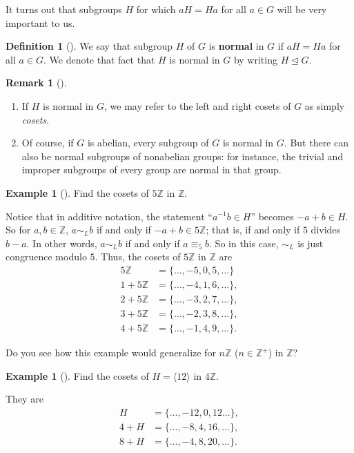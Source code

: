 \documentclass[10pt,]{book}
\newcommand{\terminology}[1]{\textbf{#1}}
\theoremstyle{plain}
\theoremstyle{definition}
\newtheorem{definition}[theorem]{Definition}
\theoremstyle{definition}
\newtheorem{remark}[theorem]{Remark}
\theoremstyle{definition}
\newtheorem{example}[theorem]{Example}
\theoremstyle{definition}
\numberwithin{equation}{section}
\def\Z{\mathbb{Z}}
\def\siml{\sim_L}
\newcommand{\amp}{&}
\begin{document}
It turns out that subgroups \(H\) for which \(aH=Ha\) for all \(a\in
G\) will be very important to us.%
\begin{definition}[{}]\label{definition-60}
We say that subgroup \(H\) of \(G\) is \terminology{normal} in \(G\) if \(aH=Ha\) for all \(a\in G\). We denote that fact that \(H\) is normal in \(G\) by writing \(H\unlhd G\).%
\end{definition}
\begin{remark}[]\label{remark-37}
\leavevmode%
\begin{enumerate}
\item\hypertarget{li-406}{}If \(H\) is normal in \(G\), we may refer to the left and right cosets of \(G\) as simply \emph{cosets}.%
\item\hypertarget{li-407}{}Of course, if \(G\) is abelian, every subgroup of \(G\) is normal in \(G\). But there can also be normal subgroups of nonabelian groups: for instance, the trivial and improper subgroups of every group are normal in that group.%
\end{enumerate}
\end{remark}
\begin{example}[]\label{example-71}
Find the cosets of \(5\Z\) in \(\Z\).%
\par
Notice that in additive notation, the statement ``\(a^{-1}b\in H\)'' becomes \(-a+b\in H\). So for \(a,b\in \Z\), \(a\siml b\) if and only if \(-a+b \in
5\Z\); that is, if and only if \(5\) divides \(b-a\). In other words, \(a\siml b\) if and only if \(a\equiv_5 b\). So in this case, \(\siml\) is just congruence modulo \(5\). Thus, the cosets of \(5\Z\) in \(\Z\) are%
\begin{align*}
5\Z\amp =\{\ldots,-5,0,5,\ldots\}\\
1+5\Z\amp =\{\ldots,-4, 1,
6,\ldots\},\\
2+5\Z\amp =\{\ldots,-3,2, 7,
\ldots\},\\
3+5\Z\amp =\{\ldots,-2,3, 8,
\ldots\},\\
4+5\Z\amp =\{\ldots,-1, 4, 9,
\ldots\}.
\end{align*}
%
\par
Do you see how this example would generalize for \(n\Z\) (\(n \in \Z^+\)) in \(\Z\)?%
\end{example}
\begin{example}[]\label{example-72}
Find the cosets of \(H=\langle 12\rangle\) in \(4\Z\).%
\par
They are%
\begin{align*}
H\amp =\{\ldots, -12,0,12\ldots\},\\
4+H \amp =
\{\ldots,-8,4,16,\ldots\},\\
8+H\amp =\{\ldots, -4,8,20,\ldots\}.
\end{align*}
%
\end{example}
\end{document}
